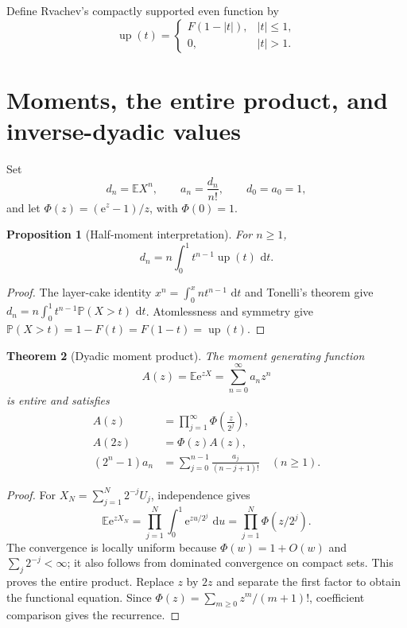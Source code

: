 \documentclass[11pt,oneside,openany]{book}
\newtheorem{theorem}{Theorem}[chapter]
\newtheorem{proposition}[theorem]{Proposition}
\theoremstyle{definition}
\theoremstyle{remark}
\newcommand{\e}{\mathrm e}
\newcommand{\dd}{\,\mathrm d}
\newcommand{\E}{\mathbb E}
\newcommand{\Prob}{\mathbb P}
\begin{document}
Define Rvachev's compactly supported even function by
\begin{equation}
 \operatorname{up}(t)=
 \begin{cases}
 F(1-|t|),&|t|\le1,\\
 0,&|t|>1.
 \end{cases}
 \label{eq:fab-up-def}
\end{equation}

\section{Moments, the entire product, and inverse-dyadic values}

Set
\begin{equation}
 d_n=\E X^n,
 \qquad a_n=\frac{d_n}{n!},
 \qquad d_0=a_0=1,
 \label{eq:fab-moments}
\end{equation}
and let $\Phi(z)=(\e^z-1)/z$, with $\Phi(0)=1$.

\begin{proposition}[Half-moment interpretation]
For $n\ge1$,
\begin{equation}
 d_n=n\int_0^1t^{n-1}\operatorname{up}(t)\,\dd t.
 \label{eq:fab-half-moment-integral}
\end{equation}
\end{proposition}

\begin{proof}
The layer-cake identity $x^n=\int_0^xnt^{n-1}\,\dd t$ and Tonelli's theorem
give $d_n=n\int_0^1t^{n-1}\Prob(X>t)\,\dd t$.  Atomlessness and symmetry give
$\Prob(X>t)=1-F(t)=F(1-t)=\operatorname{up}(t)$.
\end{proof}

\begin{theorem}[Dyadic moment product]
\label{thm:fab-moment-product}
The moment generating function
\begin{equation}
 A(z)=\E\e^{zX}=\sum_{n=0}^{\infty}a_nz^n
 \label{eq:fab-A}
\end{equation}
is entire and satisfies
\begin{align}
 A(z)&=\prod_{j=1}^{\infty}\Phi\!\left(\frac{z}{2^j}\right),
 \label{eq:fab-A-product}\\
 A(2z)&=\Phi(z)A(z),
 \label{eq:fab-A-dilation}\\
 (2^n-1)a_n&=\sum_{j=0}^{n-1}\frac{a_j}{(n-j+1)!}
 \quad(n\ge1).
 \label{eq:fab-a-recurrence}
\end{align}
\end{theorem}

\begin{proof}
For $X_N=\sum_{j=1}^{N}2^{-j}U_j$, independence gives
\[
 \E\e^{zX_N}=\prod_{j=1}^{N}\int_0^1\e^{zu/2^j}\,\dd u
 =\prod_{j=1}^{N}\Phi(z/2^j).
\]
The convergence is locally uniform because $\Phi(w)=1+O(w)$ and
$\sum_j2^{-j}<\infty$; it also follows from dominated convergence on compact
sets.  This proves the entire product.  Replace $z$ by $2z$ and separate the
first factor to obtain the functional equation.  Since
$\Phi(z)=\sum_{m\ge0}z^m/(m+1)!$, coefficient comparison gives the recurrence.
\end{proof}
\end{document}
